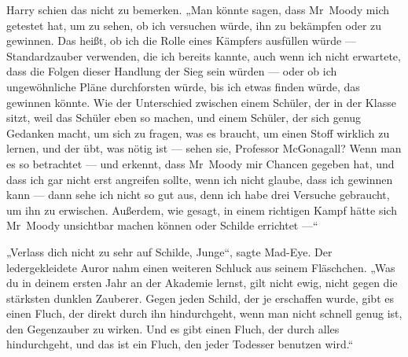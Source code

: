 Harry schien das nicht zu bemerken.
„Man könnte sagen, dass Mr~Moody mich getestet hat, um zu sehen, ob ich versuchen würde, ihn zu bekämpfen oder zu gewinnen. Das heißt, ob ich die Rolle eines Kämpfers ausfüllen würde — Standardzauber verwenden, die ich bereits kannte, auch wenn ich nicht erwartete, dass die Folgen dieser Handlung der Sieg sein würden — oder ob ich ungewöhnliche Pläne durchforsten würde, bis ich etwas finden würde, das gewinnen könnte. Wie der Unterschied zwischen einem Schüler, der in der Klasse sitzt, weil das Schüler eben so machen, und einem Schüler, der sich genug Gedanken macht, um sich zu fragen, was es braucht, um einen Stoff wirklich zu lernen, und der übt, was nötig ist — sehen sie, Professor McGonagall? Wenn man es so betrachtet — und erkennt, dass Mr~Moody mir Chancen gegeben hat, und dass ich gar nicht erst angreifen sollte, wenn ich nicht glaube, dass ich gewinnen kann — dann sehe ich nicht so gut aus, denn ich habe drei Versuche gebraucht, um ihn zu erwischen. Außerdem, wie gesagt, in einem richtigen Kampf hätte sich Mr~Moody unsichtbar machen können oder Schilde errichtet —“

„Verlass dich nicht zu sehr auf Schilde, Junge“, sagte Mad-Eye. Der ledergekleidete Auror nahm einen weiteren Schluck aus seinem Fläschchen.
„Was du in deinem ersten Jahr an der Akademie lernst, gilt nicht ewig, nicht gegen die stärksten dunklen Zauberer. Gegen jeden Schild, der je erschaffen wurde, gibt es einen Fluch, der direkt durch ihn hindurchgeht, wenn man nicht schnell genug ist, den Gegenzauber zu wirken. Und es gibt einen Fluch, der durch alles hindurchgeht, und das ist ein Fluch, den jeder Todesser benutzen wird.“


